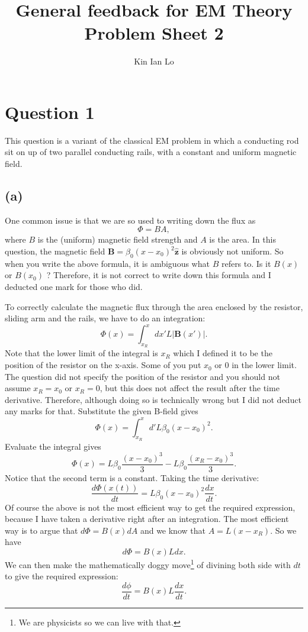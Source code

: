 \documentclass[a4paper]{article}
\title{General feedback for EM Theory Problem Sheet 2}
\author{Kin Ian Lo}
\begin{document}
\maketitle

\section*{Question 1}
\label{sec:question_1}
This question is a variant of the classical EM problem in which a conducting rod sit on up of two parallel conducting rails, with a constant and uniform magnetic field.
\subsection*{(a)}
One common issue is that we are so used to writing down the flux as 
\[
\Phi = B A
,\] 
where $B$ is the (uniform) magnetic field strength and $A$ is the area. In this question, the magnetic field $\mathbf{B} = \beta_0 (x-x_0)^2 \mathbf{\hat{z}}$ is obviously not uniform. So when you write the above formula, it is ambiguous what $B$ refers to. Is it  $B(x)$ or $B(x_0)$ ?
Therefore, it is not correct to write down this formula and I deducted one mark for those who did.

To correctly calculate the magnetic flux through the area enclosed by the resistor, sliding arm and the rails, we have to do an integration:
\[
    \Phi(x) = \int_{x_R}^x dx' L |\mathbf{B}(x')|
.\] 
Note that the lower limit of the integral is $x_R$ which I defined it to be the position of the resistor on the x-axis.
Some of you put $x_0$ or $0$ in the lower limit. The question did not specify the position of the resistor and you should not assume  $x_R = x_0$ or  $x_R = 0$, but this does not affect the result after the time derivative. Therefore, although doing so is technically wrong but I did not deduct any marks for that. 
Substitute the given B-field gives
\[
    \Phi(x) = \int_{x_R}^x d' L \beta_0 (x-x_0)^2
.\] 
Evaluate the integral gives
\[
    \Phi(x) = L \beta_0 \frac{(x-x_0)^3}{3} - L \beta_0 \frac{(x_R-x_0)^3}{3}
.\] 
Notice that the second term is a constant. Taking the time derivative:
\[
    \frac{d\Phi(x(t))}{dt} =  L \beta_0 (x-x_0)^2 \frac{dx}{dt}
.\] 
Of course the above is not the most efficient way to get the required expression, because I have taken a derivative right after an integration. 
The most efficient way is to argue that $d\Phi = B(x) dA$ and we know that $A = L (x - x_R)$. So we have 
\[
    d\Phi = B(x) L dx
.\] 
We can then make the mathematically doggy move\footnote{We are physicists so we can live with that.} of divining both side with $dt$ to give the required expression:
\[
    \frac{d\phi}{dt} = B(x)L \frac{dx}{dt}
.\] 
\end{document}
